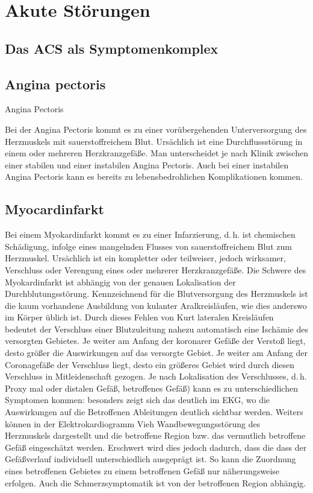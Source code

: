 \section{Akute Störungen}

\subsection{Das ACS als Symptomenkomplex}

\subsection{Angina pectoris}

Angina Pectoris

Bei der Angina Pectoris kommt es zu einer vorübergehenden
Unterversorgung des Herzmuskels mit sauerstoffreichem Blut.
Ursächlich ist eine Durchflussstörung in einem oder mehreren
Herzkranzgefäße. Man unterscheidet je nach Klinik zwischen
einer stabilen und einer instabilen Angina Pectoris. Auch
bei einer instabilen Angina Pectoris kann es bereits zu
lebensbedrohlichen Komplikationen kommen.


\subsection{Myocardinfarkt}
Bei einem Myokardinfarkt kommt es zu einer Infarzierung,
d.\,h. ist chemischen Schädigung, infolge eines mangelnden
Flusses von sauerstoffreichem Blut zum Herzmuskel.
Ursächlich ist ein kompletter oder teilweiser, jedoch
wirksamer, Verschluss oder Verengung eines oder mehrerer
Herzkranzgefäße. Die Schwere des Myokardinfarkt ist abhängig
von der genauen Lokalisation der Durchblutungsstörung.
Kennzeichnend für die Blutversorgung des Herzmuskels ist die
kaum vorhandene Ausbildung von kulanter Aralkreisläufen, wie
dies anderswo im Körper üblich ist. Durch dieses Fehlen von
Kurt lateralen Kreisläufen bedeutet der Verschluss einer
Blutzuleitung nahezu automatisch eine Ischämie des
versorgten Gebietes. Je weiter am Anfang der koronarer
Gefäße der Verstoß liegt, desto größer die Auswirkungen auf
das versorgte Gebiet. Je weiter am Anfang der Coronagefäße
der Verschluss liegt, desto ein größeres Gebiet wird durch
diesen Verschluss in Mitleidenschaft gezogen. Je nach
Lokalisation des Verschlusses, d.\,h. Proxy mal oder distalen
Gefäß, betroffenes Gefäß) kann es zu unterschiedlichen
Symptomen kommen: besonders zeigt sich das deutlich im EKG,
wo die Auswirkungen auf die Betroffenen Ableitungen deutlich
sichtbar werden. Weiters können in der Elektrokardiogramm
Vieh Wandbewegungsstörung des Herzmuskels dargestellt und
die betroffene Region bzw. das vermutlich betroffene Gefäß
eingeschätzt werden. Erschwert wird dies jedoch dadurch,
dass die dass der Gefäßverlauf individuell unterschiedlich
ausgeprägt ist. So kann die Zuordnung eines betroffenen
Gebietes zu einem betroffenen Gefäß nur näherungsweise
erfolgen. Auch die Schmerzsymptomatik ist von der
betroffenen Region abhängig.
